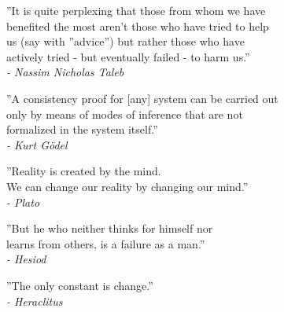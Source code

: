 \thispagestyle{plain}
\begin{flushright}
''It is quite perplexing that those from whom we have\\
benefited the most aren’t those who have tried to help\\
us (say with ''advice'') but rather those who have\\
actively tried - but eventually failed - to harm us.''\\

\textit{- Nassim Nicholas Taleb}
\end{flushright}

\begin{flushright}
''A consistency proof for [any] system can be carried out\\
only by means of modes of inference that are not\\
formalized in the system itself.''\\

\textit{- Kurt Gödel}
\end{flushright}

\begin{flushright}
''Reality is created by the mind.\\
We can change our reality by changing our mind.''\\

\textit{- Plato}
\end{flushright}

\begin{flushright}
''But he who neither thinks for himself nor\\
learns from others, is a failure as a man.''\\

\textit{- Hesiod}
\end{flushright}

\begin{flushright}
''The only constant is change.''\\

\textit{- Heraclitus}
\end{flushright}
